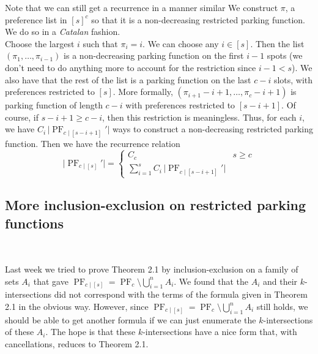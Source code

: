 \begin{remark}
	Note that we can still get a recurrence in a manner similar
	We construct $\pi$, a preference list in $[s]^{c}$ so that it is a non-decreasing restricted parking function. We do so in a \textit{Catalan} fashion. \\
	
	Choose the largest $i$ such that $\pi_{i} = i$. We can choose any $i \in [s]$. Then the list $(\pi_{1}, \dots, \pi_{i - 1})$ is a non-decreasing parking function on the first $i - 1$ spots (we don't need to do anything more to account for the restriction since $i - 1 < s$). We also have that the rest of the list is a parking function on the last $c - i$ slots, with preferences restricted to $[s]$. More formally, $(\pi_{i + 1} - i + 1, \dots, \pi_{c} - i + 1)$ is parking function of length $c - i$ with preferences restricted to $[s - i + 1]$. Of course, if $s - i + 1 \ge c - i$, then this restriction is meaningless. Thus, for each $i$, we have $C_{i} \, \lvert \operatorname{PF}_{c \mid [s - i + 1]}' \rvert$ ways to construct a non-decreasing restricted parking function. Then we have the recurrence relation
	\[
		\lvert \operatorname{PF}_{c \mid [s]}' \rvert = \begin{cases}
			C_{c} & s \ge c \\
			\sum_{i = 1}^{s} C_{i} \,  \lvert \operatorname{PF}_{c \mid [s - i + 1]}' \rvert
		\end{cases}
	\]
\end{remark}

\subsection*{More inclusion-exclusion on restricted parking functions}~

Last week we tried to prove Theorem 2.1 by inclusion-exclusion on a family of sets $A_{i}$ that gave $\operatorname{PF}_{c \mid [s]} = \operatorname{PF}_{c} \setminus \bigcup_{i = 1}^{n} A_{i}$. We found that the $A_{i}$ and their $k$-intersections did not correspond with the terms of the formula given in Theorem 2.1 in the obvious way. However, since $\operatorname{PF}_{c \mid [s]} = \operatorname{PF}_{c} \setminus \bigcup_{i = 1}^{n} A_{i}$ still holds, we should be able to get another formula if we can just enumerate the $k$-intersections of these $A_{i}$. The hope is that these $k$-intersections have a nice form that, with cancellations, reduces to Theorem 2.1.\\ 

